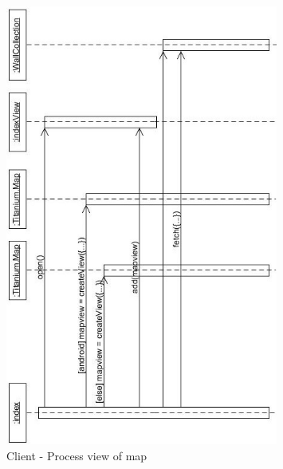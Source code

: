 \documentclass[11pt]{book}
\begin{document}
\begin{figure}[H]
      \centering
      \includegraphics[width=0.8\textwidth]{Figures/Architecture/Sequence/client/map.jpg}
      \caption{Client - Process view of map}
      \label{fig:arch_client_process_map}
\end{figure}
\end{document}
